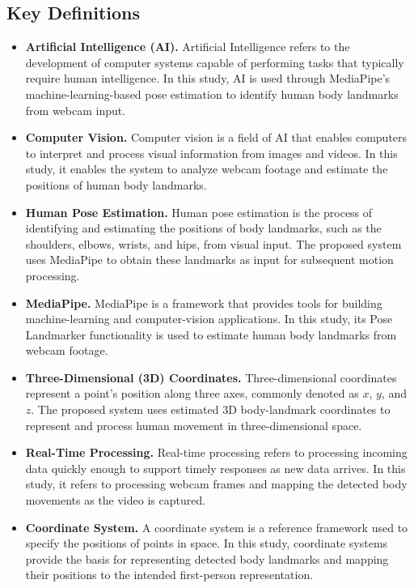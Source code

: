 \documentclass[12pt,a4paper]{article}
\begin{document}
\subsection{Key Definitions}
\begin{itemize}
    \item \textbf{Artificial Intelligence (AI).} Artificial Intelligence refers to the development of computer systems capable of performing tasks that typically require human intelligence. In this study, AI is used through MediaPipe's machine-learning-based pose estimation to identify human body landmarks from webcam input.

    \item \textbf{Computer Vision.} Computer vision is a field of AI that enables computers to interpret and process visual information from images and videos. In this study, it enables the system to analyze webcam footage and estimate the positions of human body landmarks.

    \item \textbf{Human Pose Estimation.} Human pose estimation is the process of identifying and estimating the positions of body landmarks, such as the shoulders, elbows, wrists, and hips, from visual input. The proposed system uses MediaPipe to obtain these landmarks as input for subsequent motion processing.

    \item \textbf{MediaPipe.} MediaPipe is a framework that provides tools for building machine-learning and computer-vision applications. In this study, its Pose Landmarker functionality is used to estimate human body landmarks from webcam footage.

    \item \textbf{Three-Dimensional (3D) Coordinates.} Three-dimensional coordinates represent a point's position along three axes, commonly denoted as $x$, $y$, and $z$. The proposed system uses estimated 3D body-landmark coordinates to represent and process human movement in three-dimensional space.

    \item \textbf{Real-Time Processing.} Real-time processing refers to processing incoming data quickly enough to support timely responses as new data arrives. In this study, it refers to processing webcam frames and mapping the detected body movements as the video is captured.

    \item \textbf{Coordinate System.} A coordinate system is a reference framework used to specify the positions of points in space. In this study, coordinate systems provide the basis for representing detected body landmarks and mapping their positions to the intended first-person representation.


\end{itemize}
\end{document}
